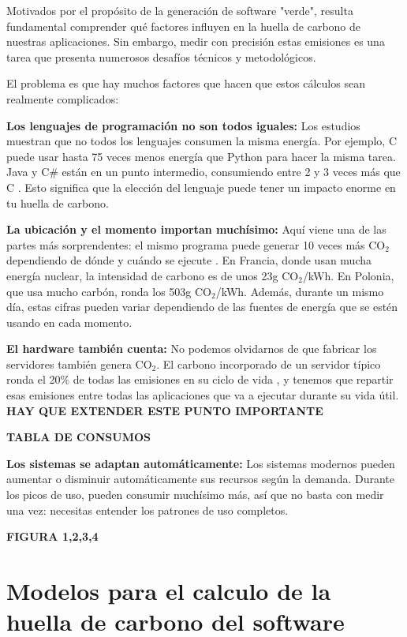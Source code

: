 \documentclass[12pt,a4paper]{report}
\begin{document}
Motivados por el propósito de la generación de software "verde", resulta fundamental 
comprender qué factores influyen en la huella de carbono de nuestras aplicaciones. 
Sin embargo, medir con precisión estas emisiones es una tarea que presenta numerosos 
desafíos técnicos y metodológicos.

El problema es que hay muchos factores que hacen que estos cálculos sean realmente complicados:

\textbf{Los lenguajes de programación no son todos iguales:} Los estudios muestran que no todos los lenguajes consumen la misma energía. Por ejemplo, C puede usar hasta 75 veces menos energía que Python para hacer la misma tarea. Java y C\# están en un punto intermedio, consumiendo entre 2 y 3 veces más que C \cite{ref8}. Esto significa que la elección del lenguaje puede tener un impacto enorme en tu huella de carbono.

\textbf{La ubicación y el momento importan muchísimo:} Aquí viene una de las partes más sorprendentes: el mismo programa puede generar 10 veces más CO$_2$ dependiendo de dónde y cuándo se ejecute \cite{ref9}. En Francia, donde usan mucha energía nuclear, la intensidad de carbono es de unos 23g CO$_2$/kWh. En Polonia, que usa mucho carbón, ronda los 503g CO$_2$/kWh. Además, durante un mismo día, estas cifras pueden variar dependiendo de las fuentes de energía que se estén usando en cada momento.

\textbf{El hardware también cuenta:} No podemos olvidarnos de que fabricar los servidores también genera CO$_2$. El carbono incorporado de un servidor típico ronda el 20\% de todas las emisiones en su ciclo de vida \cite{ref10}, y tenemos que repartir esas emisiones entre todas las aplicaciones que va a ejecutar durante su vida útil.
\textbf{HAY QUE EXTENDER ESTE PUNTO IMPORTANTE}

\textbf{TABLA DE CONSUMOS}

\textbf{Los sistemas se adaptan automáticamente:} Los sistemas modernos pueden aumentar o disminuir automáticamente sus recursos según la demanda. Durante los picos de uso, pueden consumir muchísimo más, así que no basta con medir una vez: necesitas entender los patrones de uso completos.

\textbf{FIGURA 1,2,3,4}

\section{Modelos para el calculo de la huella de carbono del software}
\end{document}
